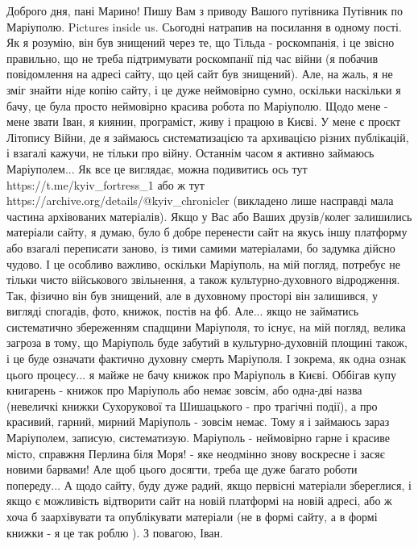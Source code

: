  
 
 
 
 

Доброго дня, пані Марино! Пишу Вам з приводу Вашого путівника Путівник по
Маріуполю. Pictures inside us. Сьогодні натрапив на посилання в одному пості.
Як я розумію, він був знищений через те, що Тільда - роскомпанія, і це звісно
правильно, що не треба підтримувати роскомпанії під час війни (я побачив
повідомлення на адресі сайту, що цей сайт був знищений). Але, на жаль, я не
зміг знайти ніде копію сайту, і це дуже неймовірно сумно, оскільки наскільки я
бачу, це була просто неймовірно красива робота по Маріуполю. Щодо мене - мене
звати Іван, я киянин, програміст, живу і працюю в Києві. У мене є проєкт
Літопису Війни, де я займаюсь систематизацією та архивацією різних публікацій,
і взагалі кажучи, не тільки про війну. Останнім часом я активно займаюсь
Маріуполем... Як все це виглядає, можна подивитись ось тут
https://t.me/kyiv_fortress_1 або ж тут
https://archive.org/details/@kyiv_chronicler (викладено лише насправді мала
частина архівованих матеріалів). Якщо у Вас або Ваших друзів/колег залишились
матеріали сайту, я думаю, було б добре перенести сайт на якусь іншу платформу
або взагалі переписати заново, із тими самими матеріалами, бо задумка дійсно
чудово. І це особливо важливо, оскільки Маріуполь, на мій погляд, потребує не
тільки чисто військового звільнення, а також культурно-духовного відродження.
Так, фізично він був знищений, але в духовному просторі він залишився, у
вигляді спогадів, фото, книжок, постів на фб. Але... якщо не займатись
систематично збереженням спадщини Маріуполя, то існує, на мій погляд, велика
загроза в тому, що Маріуполь буде забутий в культурно-духовній площині також, і
це буде означати фактично духовну смерть Маріуполя. І зокрема, як одна ознак
цього процесу... я майже не бачу книжок про Маріуполь в Києві. Оббігав купу
книгарень - книжок про Маріуполь або немає зовсім, або одна-дві назва
(невеличкі книжки Сухорукової та Шишацького - про трагічні події), а про
красивий, гарний, мирний Маріуполь - зовсім немає. Тому я і займаюсь зараз
Маріуполем, записую, систематизую. Маріуполь - неймовірно гарне і красиве
місто, справжня Перлина біля Моря! - яке неодмінно знову воскресне і засяє
новими барвами! Але щоб цього досягти, треба ще дуже багато роботи попереду...
А щодо сайту, буду дуже радий, якщо первісні матеріали збереглися, і якщо є
можливість відтворити сайт на новій платформі на новій адресі, або ж хоча б
заархівувати та опублікувати матеріали (не в формі сайту, а в формі книжки - я
це так роблю ). З повагою, Іван.
